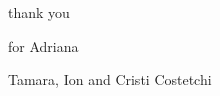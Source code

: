 
\begin{dedication} 

\centering
thank you 

\vspace{5em}
\centering
for Adriana

\vspace{1em}
Tamara, Ion and Cristi Costetchi

\end{dedication}